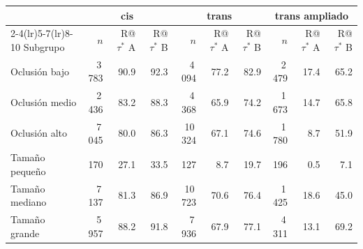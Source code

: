 \begin{tabular}{lrrrrrrrrr}
\toprule
 & \multicolumn{3}{c}{cis} & \multicolumn{3}{c}{trans} & \multicolumn{3}{c}{trans ampliado} \\ \cmidrule(lr){2-4}\cmidrule(lr){5-7}\cmidrule(lr){8-10}
Subgrupo & $n$ & R@$\tau^\ast$ A & R@$\tau^\ast$ B & $n$ & R@$\tau^\ast$ A & R@$\tau^\ast$ B & $n$ & R@$\tau^\ast$ A & R@$\tau^\ast$ B \\
\midrule
Oclusión bajo & 3\,783 & 90.9 & 92.3 & 4\,094 & 77.2 & 82.9 & 2\,479 & 17.4 & 65.2 \\
Oclusión medio & 2\,436 & 83.2 & 88.3 & 4\,368 & 65.9 & 74.2 & 1\,673 & 14.7 & 65.8 \\
Oclusión alto & 7\,045 & 80.0 & 86.3 & 10\,324 & 67.1 & 74.6 & 1\,780 & 8.7 & 51.9 \\
\midrule
Tamaño pequeño & 170 & 27.1 & 33.5 & 127 & 8.7 & 19.7 & 196 & 0.5 & 7.1 \\
Tamaño mediano & 7\,137 & 81.3 & 86.9 & 10\,723 & 70.6 & 76.4 & 1\,425 & 18.6 & 45.0 \\
Tamaño grande & 5\,957 & 88.2 & 91.8 & 7\,936 & 67.9 & 77.1 & 4\,311 & 13.1 & 69.2 \\
\bottomrule
\end{tabular}
